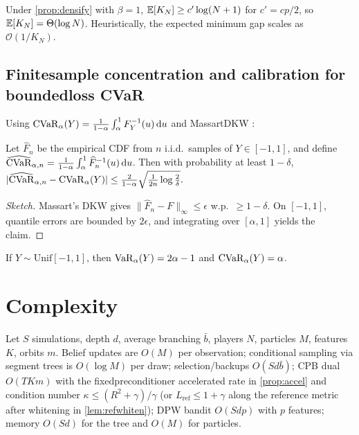 \begin{corollary}\label{cor:expect}
Under \cref{prop:densify} with $\beta=1$, $\mathbb{E}[K_N]\ge c' \log(N+1)$ for $c'=cp/2$, so $\mathbb{E}[K_N]=\Theta(\log N)$. Heuristically, the expected minimum gap scales as $\mathcal{O}(1/K_N)$.
\end{corollary}

\subsection{Finite\textendash sample concentration and calibration for bounded\textendash loss CVaR}
Using $\mathrm{CVaR}_\alpha(Y)=\frac{1}{1-\alpha}\int_\alpha^1 F_Y^{-1}(u)\,\mathrm{d}u$ \cite{rockafellar2000cvar} and Massart\textendash DKW \cite{massart1990dkw}:

\begin{proposition}\label{prop:cvar-dkw}
Let $\widehat{F}_n$ be the empirical CDF from $n$ i.i.d.\ samples of $Y\in[-1,1]$, and define $\widehat{\mathrm{CVaR}}_{\alpha,n}=\frac{1}{1-\alpha}\int_\alpha^1 \widehat{F}_n^{-1}(u)\,\mathrm{d}u$. Then with probability at least $1-\delta$,
$
|\widehat{\mathrm{CVaR}}_{\alpha,n}-\mathrm{CVaR}_\alpha(Y)| \le \frac{2}{1-\alpha}\sqrt{\frac{1}{2n}\log\frac{2}{\delta}}.
$
\end{proposition}
\begin{proof}[Sketch]
Massart’s DKW gives $\|\widehat{F}_n-F\|_\infty\le \epsilon$ w.p.\ $\ge 1-\delta$. On $[-1,1]$, quantile errors are bounded by $2\epsilon$, and integrating over $[\alpha,1]$ yields the claim.
\end{proof}

\begin{lemma}\label{lem:uniform-cvar}
If $Y\sim \mathrm{Unif}[-1,1]$, then $\mathrm{VaR}_\alpha(Y)=2\alpha-1$ and $\mathrm{CVaR}_\alpha(Y)=\alpha$.
\end{lemma}

\section{Complexity}
Let $S$ simulations, depth $d$, average branching $\bar b$, players $N$, particles $M$, features $K$, orbits $m$. Belief updates are $O(M)$ per observation; conditional sampling via segment trees is $O(\log M)$ per draw; selection/backups $O(S d \bar b)$; CPB dual $O(T K m)$ with the fixed\textendash preconditioner accelerated rate in \cref{prop:accel} and condition number $\kappa\le (R^2+\gamma)/\gamma$ (or $L_{\mathrm{ref}}\le 1+\gamma$ along the reference metric after whitening in \cref{lem:refwhiten}); DPW bandit $O(S d p)$ with $p$ features; memory $O(Sd)$ for the tree and $O(M)$ for particles.

